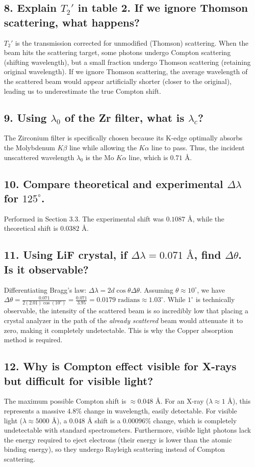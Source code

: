 \documentclass[a4paper,11pt]{article}
\begin{document}
\subsection*{8. Explain $T_2'$ in table 2. If we ignore Thomson scattering, what happens?}
$T_2'$ is the transmission corrected for unmodified (Thomson) scattering. When the beam hits the scattering target, some photons undergo Compton scattering (shifting wavelength), but a small fraction undergo Thomson scattering (retaining original wavelength). If we ignore Thomson scattering, the average wavelength of the scattered beam would appear artificially shorter (closer to the original), leading us to underestimate the true Compton shift.

\subsection*{9. Using $\lambda_0$ of the Zr filter, what is $\lambda_c$?}
The Zirconium filter is specifically chosen because its K-edge optimally absorbs the Molybdenum $K\beta$ line while allowing the $K\alpha$ line to pass. Thus, the incident unscattered wavelength $\lambda_0$ is the Mo $K\alpha$ line, which is $0.71\text{ \AA}$. 

\subsection*{10. Compare theoretical and experimental $\Delta\lambda$ for $125^\circ$.}
Performed in Section 3.3. The experimental shift was $0.1087\text{ \AA}$, while the theoretical shift is $0.0382\text{ \AA}$.

\subsection*{11. Using LiF crystal, if $\Delta\lambda = 0.071\text{ \AA}$, find $\Delta\theta$. Is it observable?}
Differentiating Bragg's law: $\Delta\lambda = 2d \cos\theta \Delta\theta$.
Assuming $\theta \approx 10^\circ$, we have $\Delta\theta = \frac{0.071}{2(2.01)\cos(10^\circ)} = \frac{0.071}{3.95} = 0.0179\text{ radians} \approx 1.03^\circ$.
While $1^\circ$ is technically observable, the intensity of the scattered beam is so incredibly low that placing a crystal analyzer in the path of the \textit{already scattered} beam would attenuate it to zero, making it completely undetectable. This is why the Copper absorption method is required.

\subsection*{12. Why is Compton effect visible for X-rays but difficult for visible light?}
The maximum possible Compton shift is $\approx 0.048\text{ \AA}$. For an X-ray ($\lambda \approx 1\text{ \AA}$), this represents a massive $4.8\%$ change in wavelength, easily detectable. For visible light ($\lambda \approx 5000\text{ \AA}$), a $0.048\text{ \AA}$ shift is a $0.00096\%$ change, which is completely undetectable with standard spectrometers. Furthermore, visible light photons lack the energy required to eject electrons (their energy is lower than the atomic binding energy), so they undergo Rayleigh scattering instead of Compton scattering.
\end{document}
